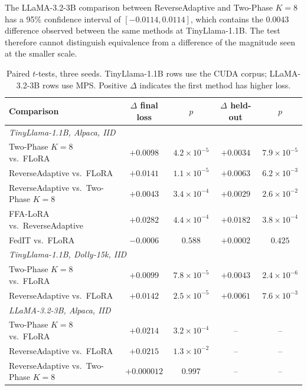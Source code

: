 The LLaMA-3.2-3B comparison between ReverseAdaptive and Two-Phase $K{=}8$ has a 95\% confidence interval of $[-0.0114, 0.0114]$, which contains the $0.0043$ difference observed between the same methods at TinyLlama-1.1B. The test therefore cannot distinguish equivalence from a difference of the magnitude seen at the smaller scale.

\begin{table}[H]
\caption{Paired $t$-tests, three seeds. TinyLlama-1.1B rows use the CUDA corpus; LLaMA-3.2-3B rows use MPS. Positive $\Delta$ indicates the first method has higher loss.}
\label{tab:d1}
\begin{center}
\footnotesize
\setlength{\tabcolsep}{3pt}
\begin{tabular}{lcccc}
\toprule
Comparison & $\Delta$ final loss & $p$ & $\Delta$ held-out & $p$ \\
\midrule
\multicolumn{5}{l}{\emph{TinyLlama-1.1B, Alpaca, IID}} \\
Two-Phase $K{=}8$ vs.\ FLoRA & $+0.0098$ & $4.2 \times 10^{-5}$ & $+0.0034$ & $7.9 \times 10^{-5}$ \\
ReverseAdaptive vs.\ FLoRA & $+0.0141$ & $1.1 \times 10^{-5}$ & $+0.0063$ & $6.2 \times 10^{-3}$ \\
ReverseAdaptive vs.\ Two-Phase $K{=}8$ & $+0.0043$ & $3.4 \times 10^{-4}$ & $+0.0029$ & $2.6 \times 10^{-2}$ \\
FFA-LoRA vs.\ ReverseAdaptive & $+0.0282$ & $4.4 \times 10^{-4}$ & $+0.0182$ & $3.8 \times 10^{-4}$ \\
FedIT vs.\ FLoRA & $-0.0006$ & $0.588$ & $+0.0002$ & $0.425$ \\
\midrule
\multicolumn{5}{l}{\emph{TinyLlama-1.1B, Dolly-15k, IID}} \\
Two-Phase $K{=}8$ vs.\ FLoRA & $+0.0099$ & $7.8 \times 10^{-5}$ & $+0.0043$ & $2.4 \times 10^{-6}$ \\
ReverseAdaptive vs.\ FLoRA & $+0.0142$ & $2.5 \times 10^{-5}$ & $+0.0061$ & $7.6 \times 10^{-3}$ \\
\midrule
\multicolumn{5}{l}{\emph{LLaMA-3.2-3B, Alpaca, IID}} \\
Two-Phase $K{=}8$ vs.\ FLoRA & $+0.0214$ & $3.2 \times 10^{-4}$ & -- & -- \\
ReverseAdaptive vs.\ FLoRA & $+0.0215$ & $1.3 \times 10^{-2}$ & -- & -- \\
ReverseAdaptive vs.\ Two-Phase $K{=}8$ & $+0.000012$ & $0.997$ & -- & -- \\
\bottomrule
\end{tabular}
\end{center}
\end{table}

